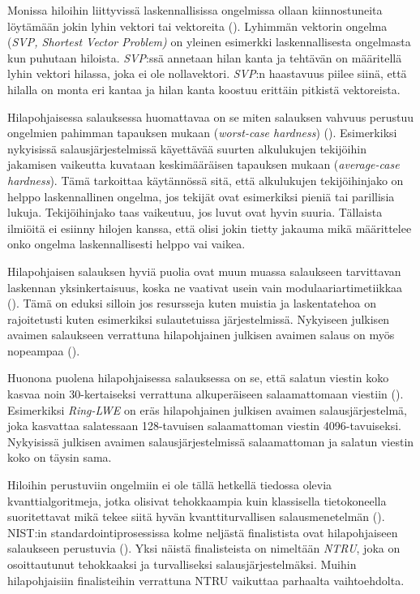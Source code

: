 Monissa hiloihin liittyvissä 
laskennallisissa ongelmissa ollaan kiinnostuneita löytämään jokin lyhin vektori tai vektoreita (\cite{regev2006lattice}). Lyhimmän vektorin ongelma (\emph{SVP, Shortest Vector Problem)} on yleinen esimerkki laskennallisesta ongelmasta kun puhutaan hiloista. \emph{SVP}:ssä annetaan hilan kanta ja tehtävän on määritellä lyhin vektori hilassa, joka ei ole nollavektori. \emph{SVP}:n haastavuus piilee siinä, että hilalla on monta eri kantaa ja hilan kanta koostuu erittäin pitkistä vektoreista.

Hilapohjaisessa salauksessa huomattavaa on se miten salauksen vahvuus perustuu ongelmien pahimman tapauksen mukaan (\emph{worst-case hardness}) (\cite{regev2006lattice}). Esimerkiksi nykyisissä salausjärjestelmissä käyettävää suurten alkulukujen tekijöihin jakamisen vaikeutta kuvataan keskimääräisen tapauksen mukaan (\emph{average-case hardness}). Tämä tarkoittaa käytännössä sitä, että alkulukujen tekijöihinjako on helppo laskennallinen ongelma, jos tekijät ovat esimerkiksi pieniä tai parillisia lukuja. Tekijöihinjako taas vaikeutuu, jos luvut ovat hyvin suuria. Tällaista ilmiöitä ei esiinny hilojen kanssa, että olisi jokin tietty jakauma mikä määrittelee onko ongelma laskennallisesti helppo vai vaikea.

Hilapohjaisen salauksen hyviä puolia ovat muun muassa salaukseen tarvittavan laskennan yksinkertaisuus, koska ne vaativat usein vain modulaariartimetiikkaa (\cite{regev2006lattice}). Tämä on eduksi silloin jos resursseja kuten muistia ja laskentatehoa on rajoitetusti kuten esimerkiksi sulautetuissa järjestelmissä. Nykyiseen julkisen avaimen salaukseen verrattuna hilapohjainen julkisen avaimen salaus on myös nopeampaa (\cite{8275352}).

Huonona puolena hilapohjaisessa salauksessa on se, että salatun viestin koko kasvaa noin 30-kertaiseksi verrattuna alkuperäiseen salaamattomaan viestiin (\cite{8275352}). Esimerkiksi \emph{Ring-LWE} on eräs hilapohjainen julkisen avaimen salausjärjestelmä, joka kasvattaa salatessaan 128-tavuisen salaamattoman viestin 4096-tavuiseksi. Nykyisissä julkisen avaimen salausjärjestelmissä salaamattoman ja salatun viestin koko on täysin sama.

Hiloihin perustuviin ongelmiin ei ole tällä hetkellä tiedossa olevia kvanttialgoritmeja, jotka olisivat tehokkaampia kuin klassisella tietokoneella suoritettavat mikä tekee siitä hyvän kvanttiturvallisen salausmenetelmän (\cite{regev2006lattice}). NIST:in standardointiprosessissa kolme neljästä finalistista ovat hilapohjaiseen salaukseen perustuvia (\cite{alagic2020status}). Yksi näistä finalisteista on nimeltään \emph{NTRU}, joka on osoittautunut tehokkaaksi ja turvalliseksi salausjärjestelmäksi. Muihin hilapohjaisiin finalisteihin verrattuna NTRU vaikuttaa parhaalta vaihtoehdolta.

